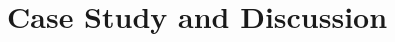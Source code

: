 \documentclass{llncs}
\begin{document}



\section{Case Study and Discussion}\label{results}

\end{document}
